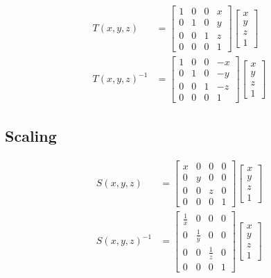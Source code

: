   \begin{align}
    T\left( x, y, z \right) &=
    \begin{bmatrix}
      1 & 0 & 0 & x \\
      0 & 1 & 0 & y \\
      0 & 0 & 1 & z \\
      0 & 0 & 0 & 1
    \end{bmatrix}
    \begin{bmatrix}
      x \\
      y \\
      z \\
      1
    \end{bmatrix} \\
    T\left( x, y, z \right)^{-1} &=
    \begin{bmatrix}
      1 & 0 & 0 & -x \\
      0 & 1 & 0 & -y \\
      0 & 0 & 1 & -z \\
      0 & 0 & 0 & 1
    \end{bmatrix}
    \begin{bmatrix}
      x \\
      y \\
      z \\
      1
    \end{bmatrix}
  \end{align}

\subsection{Scaling}

  \begin{align}
    S\left( x, y, z \right) &=
    \begin{bmatrix}
      x & 0 & 0 & 0 \\
      0 & y & 0 & 0 \\
      0 & 0 & z & 0 \\
      0 & 0 & 0 & 1
    \end{bmatrix}
    \begin{bmatrix}
      x \\
      y \\
      z \\
      1
    \end{bmatrix} \label{eq: affine-transformation-scale-bigger} \\
    S\left( x, y, z \right)^{-1} &=
    \begin{bmatrix}
      \frac{1}{x} & 0 & 0 & 0 \\
      0 & \frac{1}{y} & 0 & 0 \\
      0 & 0 & \frac{1}{z} & 0 \\
      0 & 0 & 0 & 1
    \end{bmatrix}
    \begin{bmatrix}
      x \\
      y \\
      z \\
      1
    \end{bmatrix}
  \end{align}


